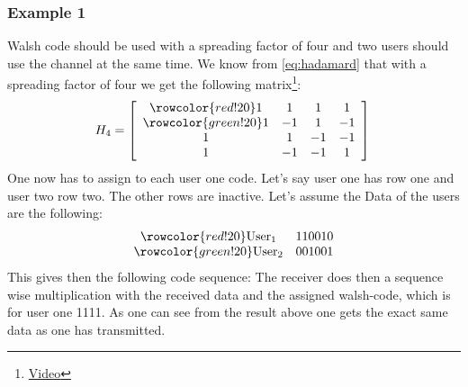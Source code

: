 \subsubsection{Example 1} \label{subsubsec:example_cdma}
Walsh code should be used with a spreading factor of four and two users should use the channel at the same time. We know from \autoref{eq:hadamard} that with a spreading factor of four we get the following matrix\footnote{\href{https://youtu.be/L4Gvu3gQ0wg}{Video}}:
$$
H_4=\left[\begin{array}{cccc}
\rowcolor{red!20}
1 & 1 & 1 & 1 \\
\rowcolor{green!20}
1 & -1 & 1 & -1 \\
1 & 1 & -1 & -1 \\
1 & -1 & -1 & 1
\end{array}\right]\\
$$
One now has to assign to each user one code. Let's say \colorbox{red!20}{user one} has row one and \colorbox{green!20}{user two} row two. The other rows are inactive. \newline
Let's assume the Data of the users are the following: 
$$
\begin{array}{cccc}
\rowcolor{red!20}
\text{User}_1 & 110010 \\
\rowcolor{green!20}
\text{User}_2 & 001001
\end{array}
$$
This gives then the following \colorbox{blue!20}{code sequence}:\newline
{}
The receiver does then a sequence wise multiplication with the received data and the assigned walsh-code, which is for user one 1111.\newline
{}
As one can see from the result above one gets the exact same data as one has transmitted.

